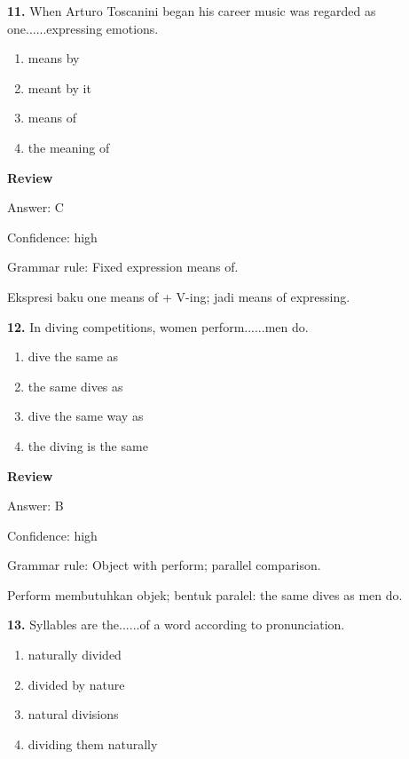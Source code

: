 \documentclass[12pt]{article}
\begin{document}
\endgroup
\par
\vspace{0.25\baselineskip}
\noindent\textbf{11.} When Arturo Toscanini began his career music was regarded as one......expressing emotions.
\begin{enumerate}[label=(\Alph*),leftmargin=*,itemsep=0.2em]
\item means by
\item meant by it
\item means of
\item the meaning of
\end{enumerate}
\par
\begingroup
\setlength{\parskip}{0pt}
\setlength{\parindent}{0pt}
\textbf{Review}\par
Answer: C\par
Confidence: high\par
Grammar rule: Fixed expression means of.\par
Ekspresi baku one means of + V-ing; jadi means of expressing.\par
\endgroup
\par
\vspace{0.25\baselineskip}
\noindent\textbf{12.} In diving competitions, women perform......men do.
\begin{enumerate}[label=(\Alph*),leftmargin=*,itemsep=0.2em]
\item dive the same as
\item the same dives as
\item dive the same way as
\item the diving is the same
\end{enumerate}
\par
\begingroup
\setlength{\parskip}{0pt}
\setlength{\parindent}{0pt}
\textbf{Review}\par
Answer: B\par
Confidence: high\par
Grammar rule: Object with perform; parallel comparison.\par
Perform membutuhkan objek; bentuk paralel: the same dives as men do.\par
\endgroup
\par
\vspace{0.25\baselineskip}
\noindent\textbf{13.} Syllables are the......of a word according to pronunciation.
\begin{enumerate}[label=(\Alph*),leftmargin=*,itemsep=0.2em]
\item naturally divided
\item divided by nature
\item natural divisions
\item dividing them naturally
\end{enumerate}
\end{document}
